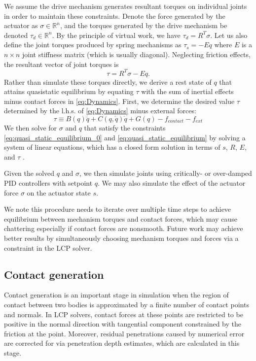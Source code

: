 We assume the drive mechanism generates resultant torques on individual joints in order to maintain these constraints.  Denote the force generated by the actuator as $\sigma \in \mathbb{R}^n$, and the torques generated by the drive mechanism be denoted $\tau_{d} \in \mathbb{R}^n$. By the principle of virtual work, we have $\tau_{d} = R^T \sigma$.  Let us also define the joint torques produced by spring mechanisms as $\tau_{s} = - E q$ where $E$ is a $n \times n$ joint stiffness matrix (which is usually diagonal).  Neglecting friction effects, the resultant vector of joint torques is
\begin{equation}
\label{eq:quasi_static_equilibrium}
\tau = R^T\sigma - E q.
\end{equation}
Rather than simulate these torques directly, we derive a rest state of $q$ that attains quasistatic equilibrium by equating $\tau$ with the sum of inertial effects minus contact forces in \eqref{eq:Dynamics}. First, we determine the desired value $\tau$ determined by the l.h.s. of \eqref{eq:Dynamics} minus external forces:
\begin{equation}
\tau \equiv B(q)\ddot{q} + C(q,\dot{q})\dot{q} + G(q) - f_{contact} - f_{ext}
\end{equation}
We then solve for $\sigma$ and $q$ that satisfy the constraints \eqref{eq:quasi_static_equilibrium_0} and \eqref{eq:quasi_static_equilibrium} by solving a system of linear equations, which has a closed form solution in terms of $s$, $R$, $E$, and $\tau$ \cite{Grioli12}.

Given the solved $q$ and $\sigma$, we then simulate joints using critically- or over-damped PID controllers with setpoint $q$.  We may also simulate the effect of the actuator force $\sigma$ on the actuator state $s$.

We note this procedure needs to iterate over multiple time steps to achieve equilibrium between mechanism torques and contact forces, which may cause chattering especially if contact forces are nonsmooth. Future work may achieve better results by simultaneously choosing mechanism torques and forces via a constraint in the LCP solver.

\subsection{Contact generation}
Contact generation is an important stage in simulation when the region of contact between two bodies is approximated by a finite number of contact points and normals. In LCP solvers, contact forces at these points are restricted to be positive in the normal direction with tangential component constrained by the friction at the point. Moreover, residual penetrations caused by numerical error are corrected for via penetration depth estimates, which are calculated in this stage.


